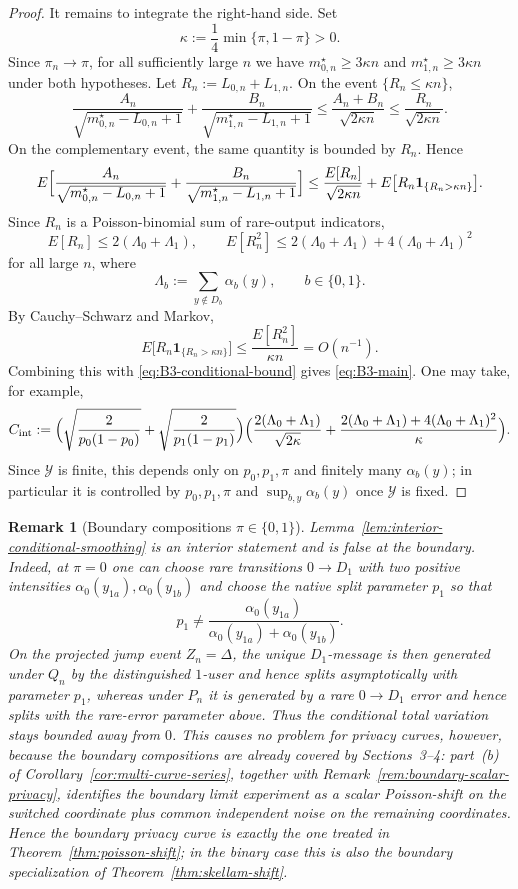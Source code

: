 \documentclass{article}
\newtheorem{remark}[theorem]{Remark}
\begin{document}
\begin{proof}
It remains to integrate the right-hand side. Set
\[
\kappa:=\frac14\min\{\pi,1-\pi\}>0.
\]
Since $\pi_n\to\pi$, for all sufficiently large $n$ we have $m_{0,n}^\star\ge 3\kappa n$ and $m_{1,n}^\star\ge 3\kappa n$ under both hypotheses. Let $R_n:=L_{0,n}+L_{1,n}$. On the event $\{R_n\le \kappa n\}$,
\[
\frac{A_n}{\sqrt{m_{0,n}^\star-L_{0,n}+1}}+\frac{B_n}{\sqrt{m_{1,n}^\star-L_{1,n}+1}}
\le \frac{A_n+B_n}{\sqrt{2\kappa n}}
\le \frac{R_n}{\sqrt{2\kappa n}}.
\]
On the complementary event, the same quantity is bounded by $R_n$. Hence
\[
E\Bigl[\frac{A_n}{\sqrt{m_{0,n}^\star-L_{0,n}+1}}+\frac{B_n}{\sqrt{m_{1,n}^\star-L_{1,n}+1}}\Bigr]
\le \frac{E[R_n]}{\sqrt{2\kappa n}}+E\bigl[R_n\mathbf 1_{\{R_n>\kappa n\}}\bigr].
\]
Since $R_n$ is a Poisson-binomial sum of rare-output indicators,
\[
E[R_n]\le 2(\Lambda_0+\Lambda_1),
\qquad
E[R_n^2]\le 2(\Lambda_0+\Lambda_1)+4(\Lambda_0+\Lambda_1)^2
\]
for all large $n$, where
\[
\Lambda_b:=\sum_{y\notin D_b}\alpha_b(y), \qquad b\in\{0,1\}.
\]
By Cauchy--Schwarz and Markov,
\[
E\bigl[R_n\mathbf 1_{\{R_n>\kappa n\}}\bigr]
\le \frac{E[R_n^2]}{\kappa n}
=O(n^{-1}).
\]
Combining this with \eqref{eq:B3-conditional-bound} gives \eqref{eq:B3-main}. One may take, for example,
\[
C_{\mathrm{int}}
:=\Bigl(\sqrt{\frac{2}{p_0(1-p_0)}}+\sqrt{\frac{2}{p_1(1-p_1)}}\Bigr)
\Bigl(\frac{2(\Lambda_0+\Lambda_1)}{\sqrt{2\kappa}}+\frac{2(\Lambda_0+\Lambda_1)+4(\Lambda_0+\Lambda_1)^2}{\kappa}\Bigr).
\]
Since $\mathcal Y$ is finite, this depends only on $p_0,p_1,\pi$ and finitely many $\alpha_b(y)$; in particular it is controlled by $p_0,p_1,\pi$ and $\sup_{b,y}\alpha_b(y)$ once $\mathcal Y$ is fixed.
\end{proof}


\begin{remark}[Boundary compositions $\pi\in\{0,1\}$]
\label{rem:B3-boundary}
Lemma~\ref{lem:interior-conditional-smoothing} is an interior statement and is false at the boundary. Indeed, at $\pi=0$ one can choose rare transitions $0\to D_1$ with two positive intensities $\alpha_0(y_{1a}),\alpha_0(y_{1b})$ and choose the native split parameter $p_1$ so that
\[
p_1\neq \frac{\alpha_0(y_{1a})}{\alpha_0(y_{1a})+\alpha_0(y_{1b})}.
\]
On the projected jump event $Z_n=\Delta$, the unique $D_1$-message is then generated under $Q_n$ by the distinguished $1$-user and hence splits asymptotically with parameter $p_1$, whereas under $P_n$ it is generated by a rare $0\to D_1$ error and hence splits with the rare-error parameter above. Thus the conditional total variation stays bounded away from $0$. This causes no problem for privacy curves, however, because the boundary compositions are already covered by Sections~3--4: part~(b) of Corollary~\ref{cor:multi-curve-series}, together with Remark~\ref{rem:boundary-scalar-privacy}, identifies the boundary limit experiment as a scalar Poisson-shift on the switched coordinate plus common independent noise on the remaining coordinates. Hence the boundary privacy curve is exactly the one treated in Theorem~\ref{thm:poisson-shift}; in the binary case this is also the boundary specialization of Theorem~\ref{thm:skellam-shift}.
\end{remark}
\end{document}
